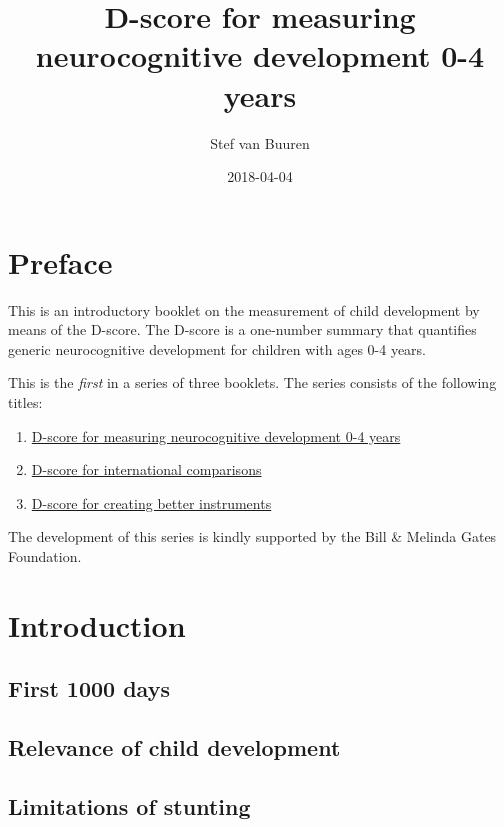 \documentclass[]{book}
\title{D-score for measuring neurocognitive development 0-4 years}
\author{Stef van Buuren}
\date{2018-04-04}
\providecommand{\tightlist}{%
  \setlength{\itemsep}{0pt}\setlength{\parskip}{0pt}}
\begin{document}
\maketitle

{
\setcounter{tocdepth}{1}
\tableofcontents
}
\chapter*{Preface}\label{preface}

This is an introductory booklet on the measurement of child development
by means of the D-score. The D-score is a one-number summary that
quantifies generic neurocognitive development for children with ages 0-4
years.

This is the \emph{first} in a series of three booklets. The series
consists of the following titles:

\begin{enumerate}
\def\labelenumi{\arabic{enumi}.}
\tightlist
\item
  \href{https://stefvanbuuren.github.io/dbook1/}{D-score for measuring
  neurocognitive development 0-4 years}
\item
  \href{https://stefvanbuuren.github.io/dbook2/}{D-score for
  international comparisons}
\item
  \href{https://stefvanbuuren.github.io/dbook3/}{D-score for creating
  better instruments}
\end{enumerate}

The development of this series is kindly supported by the Bill \&
Melinda Gates Foundation.

\chapter{Introduction}\label{intro}

\section{First 1000 days}\label{first-1000-days}

\section{Relevance of child
development}\label{relevance-of-child-development}

\section{Limitations of stunting}\label{limitations-of-stunting}
\end{document}
